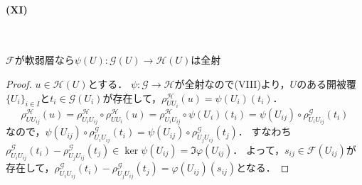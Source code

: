 \paragraph{(XI)}~
\begin{screen}
  $\mathscr{F}$が軟弱層なら$\psi(U) \colon \mathscr{G}(U) \to \mathscr{H}(U)$は全射
\end{screen}
\begin{proof}
  $u \in \mathscr{H}(U)$とする．
  $\psi\colon\mathscr{G} \to \mathscr{H}$が全射なので(VIII)より，$U$のある開被覆$\{U_i\}_{i\in I}$と$t_i \in \mathscr{G}(U_i)$が存在して，$\rho^\mathscr{H}_{UU_i}(u) = \psi(U_i)(t_i)$．
  \[
  \rho^\mathscr{H}_{UU_{ij}}(u) = \rho^\mathscr{H}_{U_i U_{ij}} \circ \rho^\mathscr{H}_{UU_i}(u)
   = \rho^\mathscr{H}_{U_i U_{ij}} \circ \psi(U_i)(t_i) = \psi(U_{ij}) \circ \rho^\mathscr{G}_{U_iU_{ij}}(t_i)
  \]
  なので，$\psi(U_{ij}) \circ \rho^\mathscr{G}_{U_iU_{ij}}(t_i) = \psi(U_{ij}) \circ \rho^\mathscr{G}_{U_jU_{ij}}(t_j)$．
  すなわち$\rho^\mathscr{G}_{U_iU_{ij}}(t_i) - \rho^\mathscr{G}_{U_jU_{ij}}(t_j) \in \ker\psi(U_{ij}) = \Im\varphi(U_{ij})$．
  よって，$s_{ij} \in \mathscr{F}(U_{ij})$が存在して，$\rho^\mathscr{G}_{U_iU_{ij}}(t_i) - \rho^\mathscr{G}_{U_jU_{ij}}(t_j) = \varphi(U_{ij})(s_{ij})$となる．


\end{proof}
